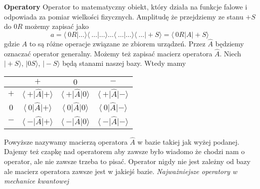 \textbf{Operatory}
Operator to matematyczny obiekt, który działa na funkcje falowe i odpowiada za pomiar wielkości fizycznych.
Amplitudę że przejdziemy ze stanu $+S$ do $0R$ możemy zapisać jako
\begin{equation*}
	a = \langle\ 0R \vert \dots \rangle \langle\ \dots \vert \dots \rangle \dots \langle\ \dots \vert \dots \rangle \langle\ \dots \vert +S \rangle  = \langle\ 0R \vert A \vert +S \rangle 
\end{equation*}
gdzie $A$ to są różne operacje związane ze zbiorem urządzeń. Przez $\hat{A}$ będziemy oznaczać operator generalny.
Możemy też zapisać macierz operatora $\hat{A}$. Niech $\vert +S \rangle$, $\vert 0S \rangle$, $\vert -S \rangle$ będą stanami naszej bazy. Wtedy mamy
\begin{table}[ht]
	\centering
	\begin{tabular}[t]{c|c|c|c}
		& $+$ & $0$ & $-$\\
		\hline
		$+$ & $\langle\ + \vert \hat{A} \vert + \rangle $ & $\langle\ + \vert \hat{A} \vert 0 \rangle $ & $\langle\ + \vert \hat{A} \vert - \rangle $ \\
		\hline
		$0$ & $\langle\ 0 \vert \hat{A} \vert + \rangle $ & $\langle\ 0 \vert \hat{A} \vert 0 \rangle $ & $\langle\ 0 \vert \hat{A} \vert - \rangle $ \\
		\hline
		$-$ & $\langle\ - \vert \hat{A} \vert + \rangle $ & $\langle\ - \vert \hat{A} \vert 0 \rangle $ & $\langle\ - \vert \hat{A} \vert - \rangle $ \\
	\end{tabular}
	\label{tab:macierzoperatora}
\end{table}

Powyższe nazywamy macierzą operatora $\hat{A}$ w bazie takiej jak wyżej podanej. Dajemy też czapkę nad operatorem aby zawsze było wiadomo że chodzi nam o operator, ale nie zawsze trzeba to pisać. Operator nigdy nie jest zależny od bazy ale macierz operatora zawsze jest w jakiejś bazie.
\textit{Najważniejsze operatory w mechanice kwantowej}

